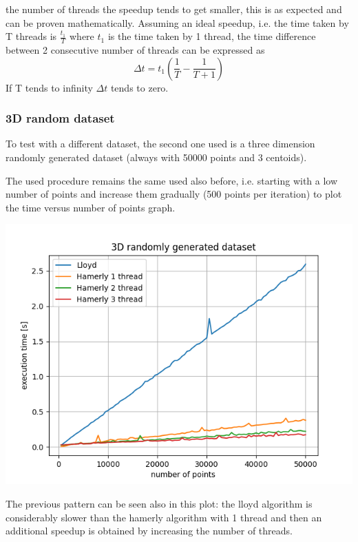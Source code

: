 \documentclass{report}
\begin{document}
\begin{minipage}[b]{0.48\textwidth}
  the number of threads the speedup tends to get smaller, this is as expected and can be proven mathematically. Assuming an ideal speedup, i.e. the time taken by T threads is $\frac{t_1}{T}$ where $t_1$ is the time taken by 1 thread, the time difference between 2 consecutive number of threads can be expressed as
  \begin{equation*}
    \Delta t = t_1 ( \frac{1}{T} - \frac{1}{T + 1} )
  \end{equation*}
  If T tends to infinity $\Delta t$ tends to zero.

  \subsubsection*{3D random dataset}
  To test with a different dataset, the second one used is a three dimension randomly generated dataset (always with 50000 points and 3 centoids).

  The used procedure remains the same used also before, i.e. starting  with a low number of points and increase them gradually (500 points per iteration) to plot the time versus number of points graph.

  \begin{center} 
    \includegraphics[width = 1\textwidth]{imgs/lh123_3Drnd.png}
    \label{fig:lh123_3Drnd}
  \end{center}

  The previous pattern can be seen also in this plot: the lloyd algorithm is considerably slower than the hamerly algorithm with 1 thread and then an additional speedup is obtained by increasing the number of threads.


\end{minipage}
\end{document}
